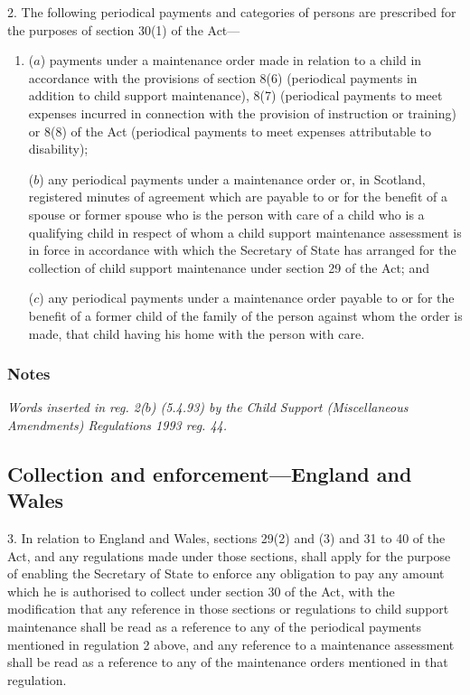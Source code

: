 \documentclass[a4paper]{article}
\newcommand\amendment[1]{\subsubsection*{Notes}{\itshape\frenchspacing\footnotesize #1 \par}}
\begin{document}
2.  The following periodical payments and categories of persons are prescribed for the purposes of section 30(1) of the Act—
\begin{enumerate}\item[]
($a$) payments under a maintenance order made in relation to a child in accordance with the provisions of section 8(6) (periodical payments in addition to child support maintenance), 8(7) (periodical payments to meet expenses incurred in connection with the provision of instruction or training) or 8(8) of the Act (periodical payments to meet expenses attributable to disability);

($b$) any periodical payments under a maintenance order 
or, in Scotland, registered minutes of agreement %
which are payable to or for the benefit of a spouse or former spouse who is the person with care of a child who is a qualifying child in respect of whom a child support maintenance assessment is in force in accordance with which the Secretary of State has arranged for the collection of child support maintenance under section 29 of the Act; and

($c$) any periodical payments under a maintenance order payable to or for the benefit of a former child of the family of the person against whom the order is made, that child having his home with the person with care.
\end{enumerate}

\amendment{
Words inserted in reg. 2($b$) (5.4.93) by the Child Support (Miscellaneous Amendments) Regulations 1993 reg. 44.
}

\subsection[3. Collection and enforcement—England and Wales]{Collection and enforcement—England and Wales}

3.  In relation to England and Wales, sections 29(2) and (3) and 31 to 40 of the Act, and any regulations made under those sections, shall apply for the purpose of enabling the Secretary of State to enforce any obligation to pay any amount which he is authorised to collect under section 30 of the Act, with the modification that any reference in those sections or regulations to child support maintenance shall be read as a reference to any of the periodical payments mentioned in regulation 2 above, and any reference to a maintenance assessment shall be read as a reference to any of the maintenance orders mentioned in that regulation.
\end{document}
